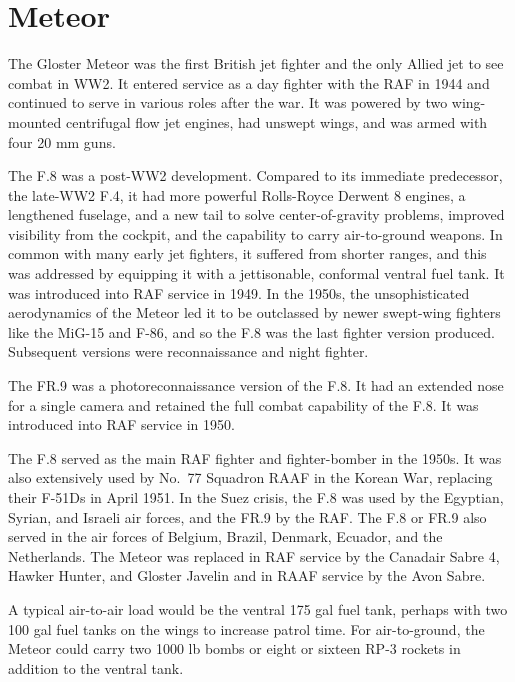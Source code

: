 \section*{Meteor}

The Gloster Meteor was the first British jet fighter and the only Allied jet to see combat in WW2. It entered service as a day fighter with the RAF in 1944 and continued to serve in various roles after the war. It was powered by two wing-mounted centrifugal flow jet engines, had unswept wings, and was armed with four 20 mm guns.

The F.8 was a post-WW2 development. Compared to its immediate predecessor, the late-WW2 F.4, it had more powerful Rolls-Royce Derwent 8 engines, a lengthened fuselage, and a new tail to solve center-of-gravity problems, improved visibility from the cockpit, and the capability to carry air-to-ground weapons. In common with many early jet fighters, it suffered from shorter ranges, and this was addressed by equipping it with a jettisonable, conformal ventral fuel tank. It was introduced into RAF service in 1949. In the 1950s, the unsophisticated aerodynamics of the Meteor led it to be outclassed by newer swept-wing fighters like the MiG-15 and F-86, and so the F.8 was the last fighter version produced. Subsequent versions were reconnaissance and night fighter.
 
The FR.9 was a photoreconnaissance version of the F.8. It had an extended nose for a single camera and retained the full combat capability of the F.8. It was introduced into RAF service in 1950.

The F.8 served as the main RAF fighter and fighter-bomber in the 1950s. It was also extensively used by No.~77 Squadron RAAF in the Korean War, replacing their F-51Ds in April 1951. In the Suez crisis, the F.8 was used by the Egyptian, Syrian, and Israeli air forces, and the FR.9 by the RAF. The F.8 or FR.9 also served in the air forces of Belgium, Brazil, Denmark, Ecuador, and the Netherlands. The Meteor was replaced in RAF service by the Canadair Sabre 4, Hawker Hunter, and Gloster Javelin and in RAAF service by the Avon Sabre.


A typical air-to-air load would be the ventral 175 gal fuel tank, perhaps with two 100 gal fuel tanks on the wings to increase patrol time. For air-to-ground, the Meteor could carry two 1000 lb bombs or eight or sixteen RP-3 rockets in addition to the ventral tank.

